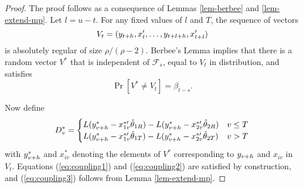 \documentclass[12pt,draft]{article}
\begin{document}
\begin{proof}
  The proof follows as a consequence of Lemmas \ref{lem-berbee} and
  \ref{lem-extend-mp}.  Let $l = u-t$.  For any fixed values of $l$
  and $T$, the sequence of vectors
  \[ V_{t} = (y_{t+h}, x_{t}', \dots, y_{t+l+h}, x_{t+l}') \] is
  absolutely regular of size $\rho/(\rho-2)$.  Berbee's Lemma implies
  that there is a random vector $V^*$ that is independent of
  $\mathcal{F}_s$, equal to $V_{t}$ in distribution, and satisfies
  \[\Pr[V^* \neq V_{t}] = \beta_{t-s}.\]

  Now define
  \begin{equation*}
    D_v^* =
    \begin{cases}
      L(y_{v+h}^* - x_{1v}^{*\prime} \hat{\theta}_{1R}) - L(y_{v+h}^* -
      x_{2v}^{*\prime} \hat{\theta}_{2R}) & v \leq T \\
      L(y_{v+h}^* - x_{1v}^{*\prime} \hat{\theta}_{1T}) - L(y_{v+h}^* -
      x_{2v}^{*\prime} \hat{\theta}_{2T}) & v > T
    \end{cases}
  \end{equation*}
  with $y_{v+h}^*$ and $x_{iv}^*$ denoting the elements of $V^*$
  corresponding to $y_{v+h}$ and $x_{iv}$ in $V_{t}$.  Equations
  (\ref{eq:coupling1}) and (\ref{eq:coupling2}) are satisfied by
  construction, and (\ref{eq:coupling3}) follows from Lemma
  \ref{lem-extend-mp}.
\end{proof}
\end{document}
